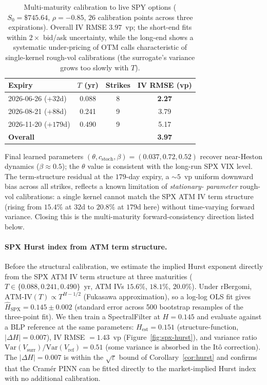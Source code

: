\documentclass[11pt,a4paper]{article}
\begin{document}
\begin{table}[h]
\centering
\caption{Multi-maturity calibration to live SPY options
($S_0 = \$745.64$, $\rho = -0.85$, $26$ calibration points across three
expirations). Overall IV RMSE $3.97$~vp; the short-end fits within
$2\times$ bid/ask uncertainty, while the long-end shows a systematic
under-pricing of OTM calls characteristic of single-kernel rough-vol
calibrations (the surrogate's variance grows too slowly with $T$).}
\label{tab:spy-multi}
\begin{tabular}{lccc}
\toprule
Expiry & $T$ (yr) & Strikes & IV RMSE (vp) \\
\midrule
2026-06-26 ($+32$d) & 0.088 & 8 & \textbf{2.27} \\
2026-08-21 ($+88$d) & 0.241 & 9 & 3.79 \\
2026-11-20 ($+179$d) & 0.490 & 9 & 5.17 \\
\midrule
\multicolumn{3}{l}{\textbf{Overall}} & \textbf{3.97} \\
\bottomrule
\end{tabular}
\end{table}

Final learned parameters
$(\theta, c_{\mathrm{stoch}}, \beta) = (0.037, 0.72, 0.52)$ recover
near-Heston dynamics ($\beta \approx 0.5$); the $\theta$ value is
consistent with the long-run SPX VIX level. The term-structure
residual at the $179$-day expiry, a $\sim 5$~vp uniform downward bias
across all strikes, reflects a known limitation of \emph{stationary-
parameter} rough-vol calibrations: a single kernel cannot match the
SPX ATM IV term structure (rising from $15.4\%$ at $32$d to $20.8\%$ at
$179$d here) without time-varying forward variance. Closing this is
the multi-maturity forward-consistency direction listed below.

\paragraph{SPX Hurst index from ATM term structure.}
Before the structural calibration, we estimate the implied Hurst exponent
directly from the SPX ATM IV term structure at three maturities
($T \in \{0.088, 0.241, 0.490\}$~yr, ATM IVs $15.6\%$, $18.1\%$, $20.0\%$).
Under rBergomi, $\mathrm{ATM\text{-}IV}(T) \propto T^{H-1/2}$ (Fukasawa
approximation), so a log-log OLS fit gives
$\hat{H}_\mathrm{SPX} = 0.145 \pm 0.002$ (standard error across 500
bootstrap resamples of the three-point fit).
We then train a SpectralFilter at $H = 0.145$ and evaluate against a BLP
reference at the same parameters: $H_\mathrm{est} = 0.151$
(structure-function, $|\Delta H| = 0.007$), IV RMSE $= 1.43$~vp
(Figure~\ref{fig:spx-hurst}), and variance ratio
$\mathrm{Var}(V_\mathrm{surr})/\mathrm{Var}(V_\mathrm{ref}) = 0.51$
(some variance is absorbed in the Itô correction).
The $|\Delta H| = 0.007$ is within the $\sqrt{\varepsilon}$ bound of
Corollary~\ref{cor:hurst} and confirms that the Cramér PINN can be
fitted directly to the market-implied Hurst index with no additional
calibration.
\end{document}
